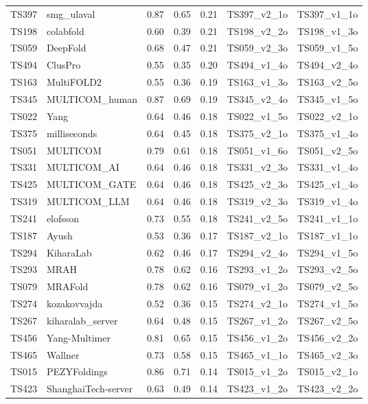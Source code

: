 \begin{longtable}{lllllll}
TS397 & smg\_ulaval & 0.87 & 0.65 & 0.21 & TS397\_v2\_1o & TS397\_v1\_1o \\ 
TS198 & colabfold & 0.60 & 0.39 & 0.21 & TS198\_v2\_2o & TS198\_v1\_3o \\ 
TS059 & DeepFold & 0.68 & 0.47 & 0.21 & TS059\_v2\_3o & TS059\_v1\_5o \\ 
TS494 & ClusPro & 0.55 & 0.35 & 0.20 & TS494\_v1\_4o & TS494\_v2\_4o \\ 
TS163 & MultiFOLD2 & 0.55 & 0.36 & 0.19 & TS163\_v1\_3o & TS163\_v2\_5o \\ 
TS345 & MULTICOM\_human & 0.87 & 0.69 & 0.19 & TS345\_v2\_4o & TS345\_v1\_5o \\ 
TS022 & Yang & 0.64 & 0.46 & 0.18 & TS022\_v1\_5o & TS022\_v2\_1o \\ 
TS375 & milliseconds & 0.64 & 0.45 & 0.18 & TS375\_v2\_1o & TS375\_v1\_4o \\ 
TS051 & MULTICOM & 0.79 & 0.61 & 0.18 & TS051\_v1\_6o & TS051\_v2\_5o \\ 
TS331 & MULTICOM\_AI & 0.64 & 0.46 & 0.18 & TS331\_v2\_3o & TS331\_v1\_4o \\ 
TS425 & MULTICOM\_GATE & 0.64 & 0.46 & 0.18 & TS425\_v2\_3o & TS425\_v1\_4o \\ 
TS319 & MULTICOM\_LLM & 0.64 & 0.46 & 0.18 & TS319\_v2\_3o & TS319\_v1\_4o \\ 
TS241 & elofsson & 0.73 & 0.55 & 0.18 & TS241\_v2\_5o & TS241\_v1\_1o \\ 
TS187 & Ayush & 0.53 & 0.36 & 0.17 & TS187\_v2\_1o & TS187\_v1\_1o \\ 
TS294 & KiharaLab & 0.62 & 0.46 & 0.17 & TS294\_v2\_4o & TS294\_v1\_5o \\ 
TS293 & MRAH & 0.78 & 0.62 & 0.16 & TS293\_v1\_2o & TS293\_v2\_5o \\ 
TS079 & MRAFold & 0.78 & 0.62 & 0.16 & TS079\_v1\_2o & TS079\_v2\_5o \\ 
TS274 & kozakovvajda & 0.52 & 0.36 & 0.15 & TS274\_v2\_1o & TS274\_v1\_5o \\ 
TS267 & kiharalab\_server & 0.64 & 0.48 & 0.15 & TS267\_v1\_2o & TS267\_v2\_5o \\ 
TS456 & Yang-Multimer & 0.81 & 0.65 & 0.15 & TS456\_v1\_2o & TS456\_v2\_2o \\ 
TS465 & Wallner & 0.73 & 0.58 & 0.15 & TS465\_v1\_1o & TS465\_v2\_3o \\ 
TS015 & PEZYFoldings & 0.86 & 0.71 & 0.14 & TS015\_v1\_2o & TS015\_v2\_1o \\ 
TS423 & ShanghaiTech-server & 0.63 & 0.49 & 0.14 & TS423\_v1\_2o & TS423\_v2\_2o \\ 

\end{longtable}
